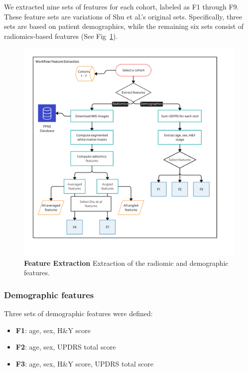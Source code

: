 We extracted nine sets of features for each cohort, labeled as F1 through F9. These feature sets are variations of Shu et al.'s original sets. Specifically, 
three sets are based on patient demographics, while the remaining six sets consist of radiomics-based features (See Fig~\ref{featureExtraction}).

\begin{figure}[!ht]
  \centering
  \includegraphics[width=\linewidth]{images/Workflow_feature_extraction.pdf}
  \caption{{\bf Feature Extraction} Extraction of the radiomic and demographic features.}
  \label{featureExtraction}
\end{figure}

\subsubsection*{Demographic features}
Three sets of demographic features were defined:

\begin{itemize}
    \item \textbf{F1}: age, sex, H\&Y score
    \item \textbf{F2}: age, sex, UPDRS total score
    \item \textbf{F3}: age, sex, H\&Y score, UPDRS total score
\end{itemize}


